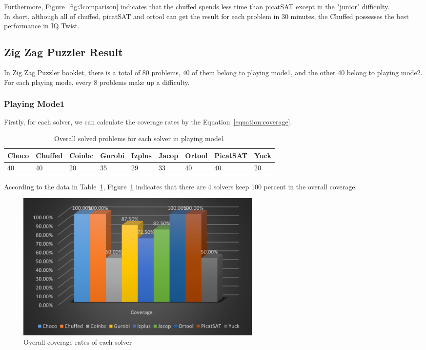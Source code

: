 Furthermore, Figure~\ref{fig:3comparison} indicates that the chuffed spends less time than picatSAT except in the "junior" difficulty.
\\In short, although all of chuffed, picatSAT and ortool can get the result for each problem in 30 minutes, the Chuffed possesses the best performance in IQ Twist.
\subsection{Zig Zag Puzzler Result}
\label{sec:Zig Zag Puzzlerresult}
In Zig Zag Puzzler booklet, there is a total of 80 problems, 40 of them belong to playing mode1, and the other 40 belong to playing mode2. For each playing mode, every 8 problems make up a difficulty. 
\subsubsection{Playing Mode1}
Firstly, for each solver, we can calculate the coverage rates by the Equation~\ref{equation:coverage}.
\begin{table}[htbp]
\centering
\caption{Overall solved problems for each solver in playing mode1}
\label{tab:solvedcase1}
\begin{tabular}{|l|l|l|l|l|l|l|l|l|}
\hline
Choco & Chuffed & Coinbc& Gurobi & Izplus&Jacop& Ortool& PicatSAT&Yuck \\
\hline
40   &40      & 20    & 35    &29     &33   &40    &40      &20\\
\hline
\end{tabular}
\end{table}
According to the data in Table~\ref{tab:solvedcase1}, Figure~\ref{fig:mode1eva2} indicates that there are 4 solvers keep 100 percent in the overall coverage.
\begin{figure}[H]
     \centering
    \includegraphics[width=0.6\textwidth]{figs/mode1coverage.png}
    \caption{Overall coverage rates of each solver}
    \label{fig:mode1eva2}
\end{figure}
